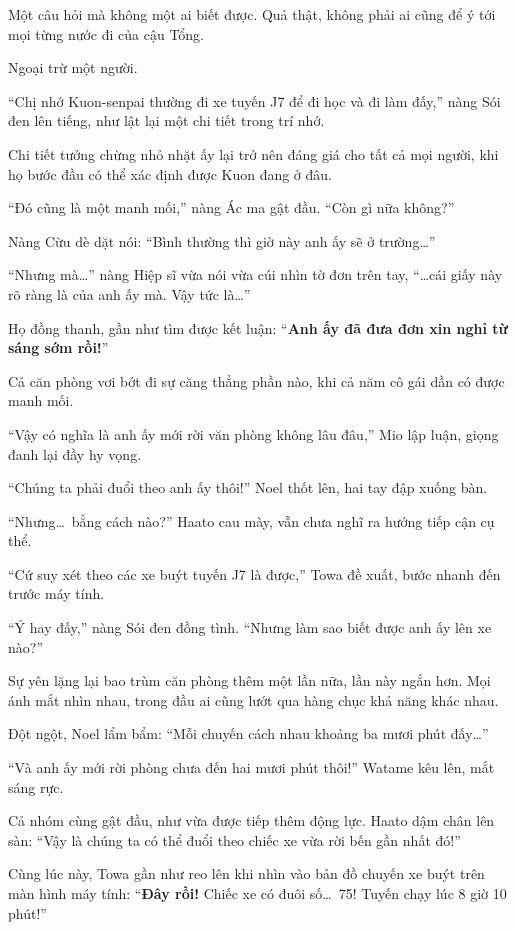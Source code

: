 \documentclass[../main.tex]{subfiles}
\begin{document}
Một câu hỏi mà không một ai biết được. Quả thật, không phải ai cũng để ý tới mọi từng nước đi của cậu Tổng.

Ngoại trừ một người.

``Chị nhớ Kuon-senpai thường đi xe tuyến J7 để đi học và đi làm đấy,'' nàng Sói đen lên tiếng, như lật lại một chi tiết trong trí nhớ.

Chi tiết tưởng chừng nhỏ nhặt ấy lại trở nên đáng giá cho tất cả mọi người, khi họ bước đầu có thể xác định được Kuon đang ở đâu.

``Đó cũng là một manh mối,'' nàng Ác ma gật đầu. ``Còn gì nữa không?''

Nàng Cừu dè dặt nói: ``Bình thường thì giờ này anh ấy sẽ ở trường\dots''

``Nhưng mà\dots'' nàng Hiệp sĩ vừa nói vừa cúi nhìn tờ đơn trên tay, ``\dots cái giấy này rõ ràng là của anh ấy mà. Vậy tức là\dots''

Họ đồng thanh, gần như tìm được kết luận: ``\textbf{Anh ấy đã đưa đơn xin nghỉ từ sáng sớm rồi!}''

Cả căn phòng vơi bớt đi sự căng thẳng phần nào, khi cả năm cô gái dần có được manh mối.

``Vậy có nghĩa là anh ấy mới rời văn phòng không lâu đâu,'' Mio lập luận, giọng đanh lại đầy hy vọng.

``Chúng ta phải đuổi theo anh ấy thôi!'' Noel thốt lên, hai tay đập xuống bàn.

``Nhưng\dots\ bằng cách nào?'' Haato cau mày, vẫn chưa nghĩ ra hướng tiếp cận cụ thể.

``Cứ suy xét theo các xe buýt tuyến J7 là được,'' Towa đề xuất, bước nhanh đến trước máy tính.

``Ý hay đấy,'' nàng Sói đen đồng tình. ``Nhưng làm sao biết được anh ấy lên xe nào?''

Sự yên lặng lại bao trùm căn phòng thêm một lần nữa, lần này ngắn hơn. Mọi ánh mắt nhìn nhau, trong đầu ai cũng lướt qua hàng chục khả năng khác nhau.

Đột ngột, Noel lẩm bẩm: ``Mỗi chuyến cách nhau khoảng ba mươi phút đấy\dots''

``Và anh ấy mới rời phòng chưa đến hai mươi phút thôi!'' Watame kêu lên, mắt sáng rực.

Cả nhóm cùng gật đầu, như vừa được tiếp thêm động lực. Haato dậm chân lên sàn: ``Vậy là chúng ta có thể đuổi theo chiếc xe vừa rời bến gần nhất đó!''

Cùng lúc này, Towa gần như reo lên khi nhìn vào bản đồ chuyến xe buýt trên màn hình máy tính: ``\textbf{Đây rồi!} Chiếc xe có đuôi số\dots\ 75! Tuyến chạy lúc 8 giờ 10 phút!''
\end{document}
